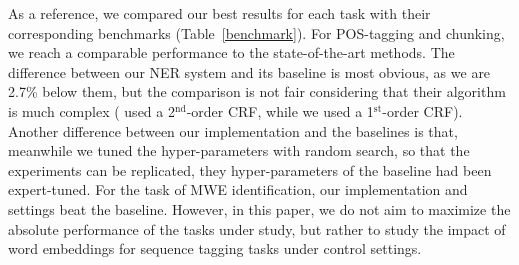 As a reference, we compared our best results for each task with their corresponding benchmarks (Table~\ref{benchmark}). 
For POS-tagging and chunking, we reach a comparable performance to the state-of-the-art methods.
The difference between our NER system and its baseline is most obvious, as we are 2.7\%  below them, but the comparison is not fair considering that their algorithm is much complex
( used a 2$^{\text{nd}}$-order CRF, while we used a 1$^{\text{st}}$-order CRF).
Another difference between our implementation and the baselines is that, meanwhile we tuned the hyper-parameters with random search, so that the experiments can be replicated, they hyper-parameters of the baseline had been expert-tuned. 
For the task of MWE identification, our implementation and settings beat the baseline. 
However, in this paper, we do not aim to maximize the absolute performance of the tasks under 
study, but rather to study the impact of word embeddings for sequence tagging tasks under control settings.


